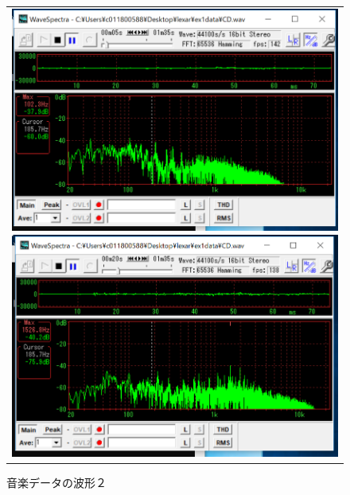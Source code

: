 \documentclass[uplatex, titlepage]{jsarticle}
\begin{document}
\begin{figure}[H]
    \begin{tabular}{c}

      \begin{minipage}{0.45\hsize}
        \begin{center}
          \includegraphics[scale=0.45]{./tuusin1.2/cd01.png}
          \caption{音楽データの波形１}
          \label{fig:cd01}
        \end{center}
      \end{minipage}

      \begin{minipage}{0.45\hsize}
        \begin{center}
          \includegraphics[scale=0.45]{./tuusin1.2/cd02.png}
          \caption{音楽データの波形２}
          \label{fig:cd02}
        \end{center}
      \end{minipage}

    \end{tabular}
\end{figure}
\end{document}
